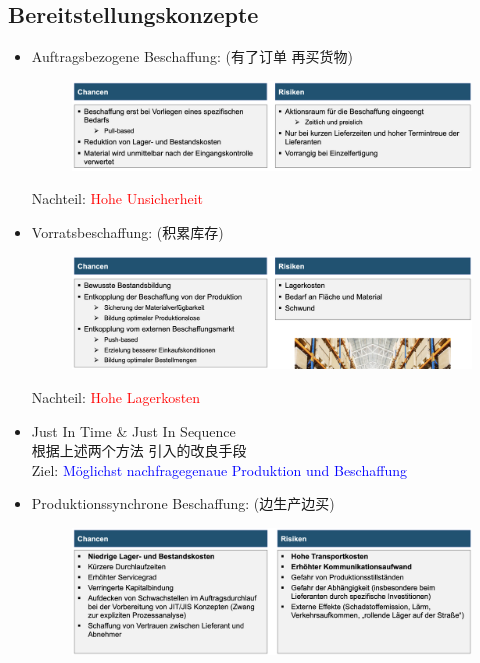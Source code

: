\documentclass[12pt, letterpaper]{article}
\begin{document}
\begin{CJK*}{UTF8}{gbsn}
\subsection{Bereitstellungskonzepte}
\begin{itemize}
\item Auftragsbezogene Beschaffung: (有了订单 再买货物)\\
\begin{figure}[h!]
  \centering %
  \includegraphics[width=0.7\linewidth]{VL32.png}\\
\end{figure}
Nachteil: \textcolor{red}{Hohe Unsicherheit}

\item Vorratsbeschaffung: (积累库存)\\
\begin{figure}[h!]
  \centering %
  \includegraphics[width=0.7\linewidth]{VL33.png}\\
\end{figure}
Nachteil: \textcolor{red}{Hohe Lagerkosten}

\item Just In Time \& Just In Sequence\\
根据上述两个方法 引入的改良手段\\
Ziel: \textcolor{blue}{Möglichst nachfragegenaue Produktion und Beschaffung}


\item Produktionssynchrone Beschaffung: (边生产边买)\\
\begin{figure}[h!]
  \centering %
  \includegraphics[width=0.7\linewidth]{VL34.png}\\
\end{figure}


\end{itemize}
\end{CJK*}
\end{document}
